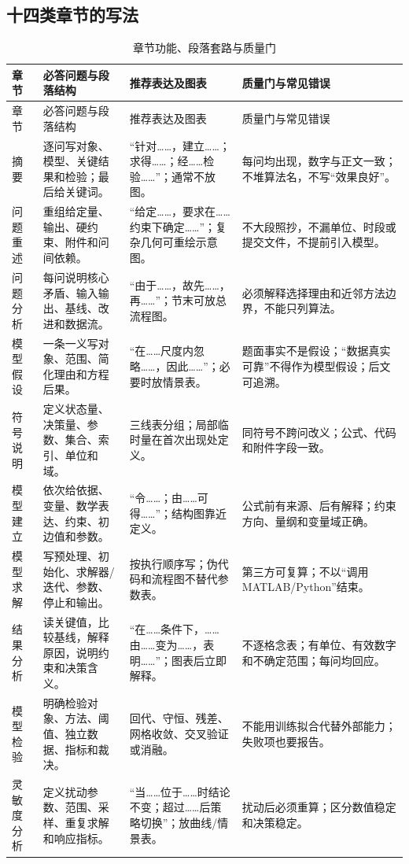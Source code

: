 \subsection{十四类章节的写法}

\begin{longtable}{p{1.8cm}p{4.2cm}p{4.0cm}p{4.0cm}}
\caption{章节功能、段落套路与质量门}\label{tab:sections}\\
\toprule
章节 & 必答问题与段落结构 & 推荐表达及图表 & 质量门与常见错误\\
\midrule
\endfirsthead
\toprule
章节 & 必答问题与段落结构 & 推荐表达及图表 & 质量门与常见错误\\
\midrule
\endhead
摘要 & 逐问写对象、模型、关键结果和检验；最后给关键词。 & “针对……，建立……；求得……；经……检验……”；通常不放图。 & 每问均出现，数字与正文一致；不堆算法名，不写“效果良好”。\\
问题重述 & 重组给定量、输出、硬约束、附件和问间依赖。 & “给定……，要求在……约束下确定……”；复杂几何可重绘示意图。 & 不大段照抄，不漏单位、时段或提交文件，不提前引入模型。\\
问题分析 & 每问说明核心矛盾、输入输出、基线、改进和数据流。 & “由于……，故先……，再……”；节末可放总流程图。 & 必须解释选择理由和近邻方法边界，不能只列算法。\\
模型假设 & 一条一义写对象、范围、简化理由和方程后果。 & “在……尺度内忽略……，因此……”；必要时放情景表。 & 题面事实不是假设；“数据真实可靠”不得作为模型假设；后文可追溯。\\
符号说明 & 定义状态量、决策量、参数、集合、索引、单位和域。 & 三线表分组；局部临时量在首次出现处定义。 & 同符号不跨问改义；公式、代码和附件字段一致。\\
模型建立 & 依次给依据、变量、数学表达、约束、初边值和参数。 & “令……；由……可得……”；结构图靠近定义。 & 公式前有来源、后有解释；约束方向、量纲和变量域正确。\\
模型求解 & 写预处理、初始化、求解器/迭代、参数、停止和输出。 & 按执行顺序写；伪代码和流程图不替代参数表。 & 第三方可复算；不以“调用 MATLAB/Python”结束。\\
结果分析 & 读关键值，比较基线，解释原因，说明约束和决策含义。 & “在……条件下，……由……变为……，表明……”；图表后立即解释。 & 不逐格念表；有单位、有效数字和不确定范围；每问均回应。\\
模型检验 & 明确检验对象、方法、阈值、独立数据、指标和裁决。 & 回代、守恒、残差、网格收敛、交叉验证或消融。 & 不能用训练拟合代替外部能力；失败项也要报告。\\
灵敏度分析 & 定义扰动参数、范围、采样、重复求解和响应指标。 & “当……位于……时结论不变；超过……后策略切换”；放曲线/情景表。 & 扰动后必须重算；区分数值稳定和决策稳定。\\

\end{longtable}
